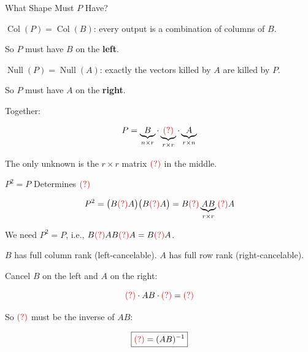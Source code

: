 \documentclass[10pt]{beamer}
\theoremstyle{definition}
\newcommand{\x}[1]{\alert{\textbf{#1}}}
\newcommand{\rd}[1]{{\color{red}#1}}                  %
\begin{document}
\begin{frame}{What Shape Must $P$ Have?}

$\operatorname{Col}(P) = \operatorname{Col}(B)$: every output is a combination of columns of $B$.

So $P$ must have $B$ on the \x{left}.

\vspace{0.5em}

$\operatorname{Null}(P) = \operatorname{Null}(A)$: exactly the vectors killed by $A$ are killed by $P$.

So $P$ must have $A$ on the \x{right}.

\vspace{0.5em}

Together:

$$P = \underbrace{B}_{n \times r} \cdot \underbrace{\rd{(?)}}_{r \times r} \cdot \underbrace{A}_{r \times n}$$

\vspace{0.3em}

The only unknown is the $r \times r$ matrix $\rd{(?)}$ in the middle.

\end{frame}


\begin{frame}{$P^2 = P$ Determines $\rd{(?)}$}

$$P^2 = \big(B\rd{(?)}A\big)\big(B\rd{(?)}A\big) = B\rd{(?)}\underbrace{AB}_{r \times r}\rd{(?)}A$$

\vspace{0.3em}

We need $P^2 = P$, i.e., $B\rd{(?)}AB\rd{(?)}A = B\rd{(?)}A$.

\vspace{0.5em}

$B$ has full column rank (left-cancelable). $A$ has full row rank (right-cancelable).

Cancel $B$ on the left and $A$ on the right:

$$\rd{(?)} \cdot AB \cdot \rd{(?)} = \rd{(?)}$$

\vspace{0.3em}

So $\rd{(?)}$ must be the inverse of $AB$:

$$\boxed{\rd{(?)} = (AB)^{-1}}$$

\end{frame}
\end{document}
